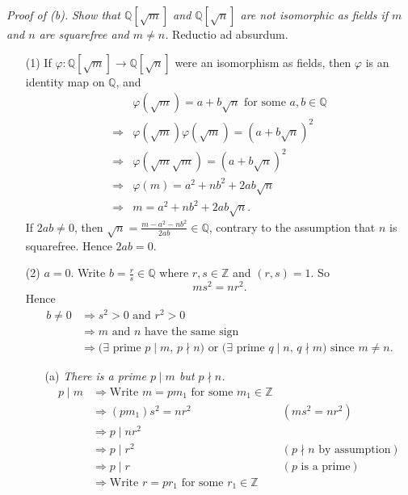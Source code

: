 \documentclass{article}
\begin{document}
\emph{Proof of (b).}
\emph{Show that $\mathbb{Q}[\sqrt{m}]$ and $\mathbb{Q}[\sqrt{n}]$
are not isomorphic as fields if $m$ and $n$ are squarefree and $m \neq n$.}
Reductio ad absurdum.
\begin{enumerate}
\item[(1)]
If $\varphi: \mathbb{Q}[\sqrt{m}] \to \mathbb{Q}[\sqrt{n}]$ were an isomorphism
as fields, then $\varphi$ is an identity map on $\mathbb{Q}$, and
\begin{align*}
&\varphi(\sqrt{m}) = a + b\sqrt{n} \text{ for some } a, b \in \mathbb{Q} \\
\Longrightarrow&
\varphi(\sqrt{m})\varphi(\sqrt{m}) = (a + b\sqrt{n})^2 \\
\Longrightarrow&
\varphi(\sqrt{m} \sqrt{m}) = (a + b\sqrt{n})^2 \\
\Longrightarrow&
\varphi(m) = a^2 + nb^2 + 2ab\sqrt{n} \\
\Longrightarrow&
m = a^2 + nb^2 + 2ab\sqrt{n}.
\end{align*}
If $2ab \neq 0$, then $\sqrt{n} = \frac{m-a^2-nb^2}{2ab} \in \mathbb{Q}$,
contrary to the assumption that $n$ is squarefree.
Hence $2ab = 0$.
\item[(2)]
$a = 0$.
Write $b = \frac{r}{s} \in \mathbb{Q}$ where $r, s \in \mathbb{Z}$ and $(r, s) = 1$.
So $$ms^2 = nr^2.$$
Hence
\begin{align*}
b \neq 0
&\Longrightarrow
s^2 > 0 \text{ and } r^2 > 0 \\
&\Longrightarrow
\text{$m$ and $n$ have the same sign} \\
&\Longrightarrow
\text{($\exists$ prime $p \mid m$, $p \nmid n$) or
($\exists$ prime $q \mid n$, $q \nmid m$) since $m \neq n$}.
\end{align*}
  \begin{enumerate}
  \item[(a)]
  \emph{There is a prime $p \mid m$ but $p \nmid n$.}
  \begin{align*}
  p \mid m
  &\Longrightarrow
  \text{Write $m = pm_1$ for some $m_1 \in \mathbb{Z}$} \\
  &\Longrightarrow
  (pm_1)s^2 = nr^2
    &(ms^2 = nr^2) \\
  &\Longrightarrow
  p \mid nr^2 \\
  &\Longrightarrow
  p \mid r^2
    &(\text{$p \nmid n$ by assumption}) \\
  &\Longrightarrow
  p \mid r
    &(\text{$p$ is a prime}) \\
  &\Longrightarrow
  \text{Write $r = pr_1$ for some $r_1 \in \mathbb{Z}$} \\

\end{align*}
\end{enumerate}
\end{enumerate}
\end{document}

